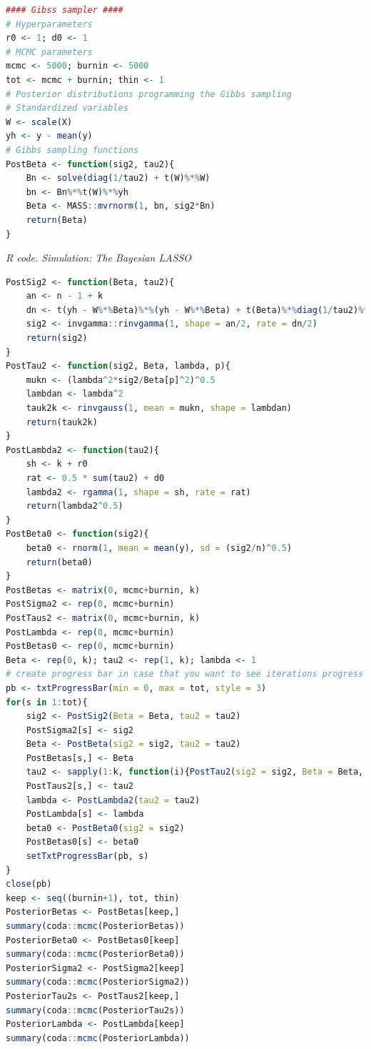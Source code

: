 \begin{enumerate}[leftmargin=*]
\begin{tcolorbox}[enhanced,width=4.67in,center upper,
	fontupper=\large\bfseries,drop shadow southwest,sharp corners]
\begin{VF}
\begin{lstlisting}[language=R]
#### Gibss sampler ####
# Hyperparameters
r0 <- 1; d0 <- 1
# MCMC parameters
mcmc <- 5000; burnin <- 5000
tot <- mcmc + burnin; thin <- 1
# Posterior distributions programming the Gibbs sampling
# Standardized variables
W <- scale(X)
yh <- y - mean(y)
# Gibbs sampling functions
PostBeta <- function(sig2, tau2){
	Bn <- solve(diag(1/tau2) + t(W)%*%W)
	bn <- Bn%*%t(W)%*%yh
	Beta <- MASS::mvrnorm(1, bn, sig2*Bn)
	return(Beta)
}
\end{lstlisting}
	\end{VF}
\end{tcolorbox} 
 
\begin{tcolorbox}[enhanced,width=4.67in,center upper,
	fontupper=\large\bfseries,drop shadow southwest,sharp corners]
	\textit{R code. Simulation: The Bayesian LASSO}
	\begin{VF}
		\begin{lstlisting}[language=R]
PostSig2 <- function(Beta, tau2){
	an <- n - 1 + k
	dn <- t(yh - W%*%Beta)%*%(yh - W%*%Beta) + t(Beta)%*%diag(1/tau2)%*%Beta
	sig2 <- invgamma::rinvgamma(1, shape = an/2, rate = dn/2)
	return(sig2)
}
PostTau2 <- function(sig2, Beta, lambda, p){
	mukn <- (lambda^2*sig2/Beta[p]^2)^0.5
	lambdan <- lambda^2
	tauk2k <- rinvgauss(1, mean = mukn, shape = lambdan)
	return(tauk2k)
}
PostLambda2 <- function(tau2){
	sh <- k + r0
	rat <- 0.5 * sum(tau2) + d0
	lambda2 <- rgamma(1, shape = sh, rate = rat)
	return(lambda2^0.5)
}
PostBeta0 <- function(sig2){
	beta0 <- rnorm(1, mean = mean(y), sd = (sig2/n)^0.5)
	return(beta0)
}
PostBetas <- matrix(0, mcmc+burnin, k)
PostSigma2 <- rep(0, mcmc+burnin)
PostTaus2 <- matrix(0, mcmc+burnin, k)
PostLambda <- rep(0, mcmc+burnin)
PostBetas0 <- rep(0, mcmc+burnin)
Beta <- rep(0, k); tau2 <- rep(1, k); lambda <- 1
# create progress bar in case that you want to see iterations progress
pb <- txtProgressBar(min = 0, max = tot, style = 3)
for(s in 1:tot){
	sig2 <- PostSig2(Beta = Beta, tau2 = tau2)
	PostSigma2[s] <- sig2
	Beta <- PostBeta(sig2 = sig2, tau2 = tau2)
	PostBetas[s,] <- Beta
	tau2 <- sapply(1:k, function(i){PostTau2(sig2 = sig2, Beta = Beta, lambda = lambda, p = i)})
	PostTaus2[s,] <- tau2
	lambda <- PostLambda2(tau2 = tau2)
	PostLambda[s] <- lambda
	beta0 <- PostBeta0(sig2 = sig2)
	PostBetas0[s] <- beta0
	setTxtProgressBar(pb, s)
}
close(pb)
keep <- seq((burnin+1), tot, thin)
PosteriorBetas <- PostBetas[keep,]
summary(coda::mcmc(PosteriorBetas))
PosteriorBeta0 <- PostBetas0[keep]
summary(coda::mcmc(PosteriorBeta0))
PosteriorSigma2 <- PostSigma2[keep]
summary(coda::mcmc(PosteriorSigma2))
PosteriorTau2s <- PostTaus2[keep,]
summary(coda::mcmc(PosteriorTau2s))
PosteriorLambda <- PostLambda[keep]
summary(coda::mcmc(PosteriorLambda))
\end{lstlisting}
	\end{VF}
\end{tcolorbox} 


\end{enumerate}
